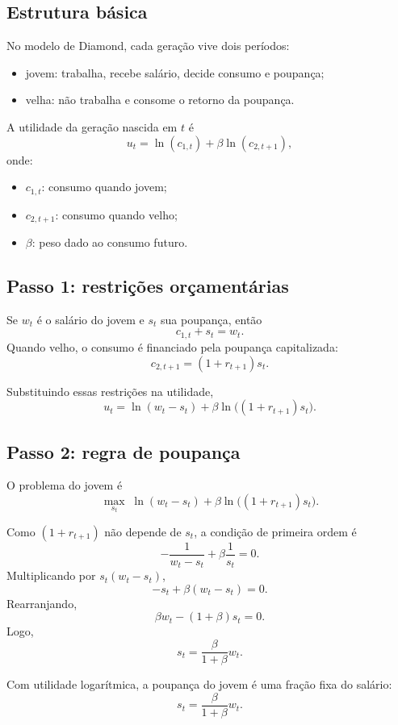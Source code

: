 \documentclass[11pt,a4paper]{article}
\begin{document}
\subsection{Estrutura b\'asica}

No modelo de Diamond, cada gera\c{c}\~ao vive dois per\'iodos:
\begin{itemize}
  \item jovem: trabalha, recebe sal\'ario, decide consumo e poupan\c{c}a;
  \item velha: n\~ao trabalha e consome o retorno da poupan\c{c}a.
\end{itemize}

A utilidade da gera\c{c}\~ao nascida em \(t\) \'e
\[
u_t=\ln(c_{1,t})+\beta\ln(c_{2,t+1}),
\]
onde:
\begin{itemize}
  \item \(c_{1,t}\): consumo quando jovem;
  \item \(c_{2,t+1}\): consumo quando velho;
  \item \(\beta\): peso dado ao consumo futuro.
\end{itemize}

\subsection{Passo 1: restri\c{c}\~oes or\c{c}ament\'arias}

Se \(w_t\) \'e o sal\'ario do jovem e \(s_t\) sua poupan\c{c}a, ent\~ao
\[
c_{1,t}+s_t=w_t.
\]
Quando velho, o consumo \'e financiado pela poupan\c{c}a capitalizada:
\[
c_{2,t+1}=(1+r_{t+1})s_t.
\]

Substituindo essas restri\c{c}\~oes na utilidade,
\[
u_t=\ln(w_t-s_t)+\beta\ln\!\bigl((1+r_{t+1})s_t\bigr).
\]

\subsection{Passo 2: regra de poupan\c{c}a}

O problema do jovem \'e
\[
\max_{s_t}\;
\ln(w_t-s_t)+\beta\ln\!\bigl((1+r_{t+1})s_t\bigr).
\]

Como \((1+r_{t+1})\) n\~ao depende de \(s_t\), a condi\c{c}\~ao de primeira ordem
\'e
\[
-\frac{1}{w_t-s_t}+\beta\frac{1}{s_t}=0.
\]
Multiplicando por \(s_t(w_t-s_t)\),
\[
-s_t+\beta(w_t-s_t)=0.
\]
Rearranjando,
\[
\beta w_t-(1+\beta)s_t=0.
\]
Logo,
\[
s_t=\frac{\beta}{1+\beta}w_t.
\]

\begin{resultado}
Com utilidade logar\'itmica, a poupan\c{c}a do jovem \'e uma fra\c{c}\~ao fixa do
sal\'ario:
\[
s_t=\frac{\beta}{1+\beta}w_t.
\]
\end{resultado}
\end{document}
